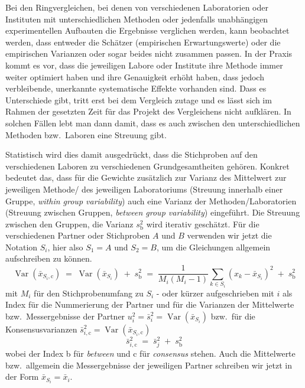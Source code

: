 Bei den Ringvergleichen, bei denen von verschiedenen Laboratorien oder Instituten mit
unterschiedlichen Methoden oder jedenfalls unabhängigen experimentellen Aufbauten die
Ergebnisse verglichen werden, kann beobachtet werden, dass entweder die
Schätzer (empirischen Erwartungswerte) oder die empirischen Varianzen oder sogar
beides nicht zusammen passen. In der Praxis kommt es vor, dass die jeweiligen
Labore oder Institute ihre Methode immer weiter optimiert haben und ihre Genauigkeit
erhöht haben, dass jedoch verbleibende, unerkannte systematische Effekte vorhanden sind.
Dass es Unterschiede gibt, tritt erst bei dem Vergleich zutage und es lässt sich
im Rahmen der gesetzten Zeit für das Projekt des Vergleichens nicht aufklären.
In solchen Fällen lebt man dann damit, dass es auch zwischen den unterschiedlichen
Methoden bzw.\ Laboren eine Streuung gibt.

Statistisch wird dies damit ausgedrückt, dass die Stichproben auf den verschiedenen
Laboren zu verschiedenen Grundgesamtheiten gehören.
Konkret bedeutet das, dass für die Gewichte zusätzlich zur Varianz des Mittelwert
zur jeweiligen Methode/ des jeweiligen Laboratoriums
(Streuung innerhalb einer Gruppe, \textsl{within group variability})
auch eine Varianz der Methoden/Laboratorien (Streuung zwischen Gruppen,
\textsl{between group variability}) eingeführt.
Die Streuung zwischen den Gruppen, die Varianz $s^2_\mathrm{b}$ wird
iterativ geschätzt. Für die verschiedenen Partner oder Stichproben $A$ und $B$
verwenden wir jetzt die Notation $S_i$, hier also $S_1 = A$ und $S_2 = B$, um
die Gleichungen allgemein aufschreiben zu können.
\begin{equation*}
\operatorname{Var}(\bar x_{S_i,\mathrm{c}}) \; = \;
\operatorname{Var}(\bar x_{S_i}) \; + \; s^2_\mathrm{b} \; = \;
\frac{1}{M_i (M_i - 1)} \sum\limits_{k \in S_i}
\left( x_{k} - \bar x_{S_i} \right)^2
\; + \; s^2_\mathrm{b}
\end{equation*}
mit $M_i$ für den Stichprobenumfang zu $S_i$ -
oder kürzer aufgeschrieben mit $i$ als Index für die Nummerierung der Partner
und für die Varianzen der Mittelwerte bzw.\ Messergebnisse
der Partner
$u^2_i = \bar s^2_i = \operatorname{Var}(\bar x_{S_i})$
bzw.\ für die Konsensusvarianzen
$\bar s^2_{i,\mathrm{c}} = \operatorname{Var}(\bar x_{S_i,\mathrm{c}})$
\begin{equation}
\bar s^2_{i,\mathrm{c}} \; = \; \bar s^2_j \; + \; s^2_\mathrm{b}
\label{eq:consensusVariability}
\end{equation}
wobei der Index b für \textsl{between} und c für \textsl{consensus}
stehen. Auch die Mittelwerte bzw.\ allgemein die Messergebnisse der
jeweiligen Partner schreiben wir jetzt in der Form $\bar x_{S_i} = \bar x_i$.

